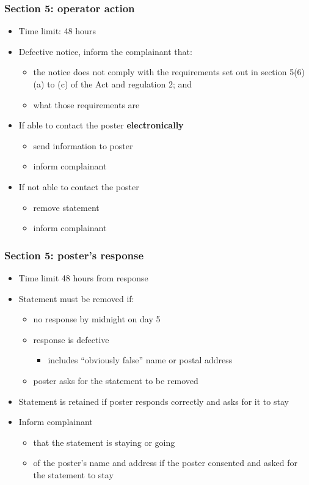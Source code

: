 \documentclass[ignorenonframetext,]{beamer}
\begin{document}
\begin{frame}
  \frametitle{Section 5: operator action}

  \begin{itemize}
  \item Time limit: 48 hours
  \item Defective notice, inform the complainant that:
\begin{itemize}
\item the notice does not comply with the requirements set out in section 5(6)(a) to (c) of the Act and regulation 2; and
\item what those requirements are
\end{itemize}
\item If able to contact the poster {\bf electronically}
  \begin{itemize}
  \item send information to poster
  \item inform complainant
  \end{itemize}
\item If not able to contact the poster
  \begin{itemize}
  \item remove statement
  \item inform complainant
  \end{itemize}

  \end{itemize}
\end{frame}

\begin{frame}
  \frametitle{Section 5: poster's response}
  \begin{itemize}
  \item Time limit 48 hours from response
  \item Statement must be removed if:
    \begin{itemize}
    \item no response by midnight on day 5
    \item response is defective
      \begin{itemize}
      \item includes ``obviously false'' name or postal address
      \end{itemize}
    \item poster asks for the statement to be removed
    \end{itemize}
  \item Statement is retained if poster responds correctly and asks for it to stay
  \item Inform complainant
    \begin{itemize}
    \item that the statement is staying or going
    \item of the poster's name and address if the poster consented and asked for the statement to stay
    \end{itemize}
  \end{itemize}
\end{frame}
\end{document}

